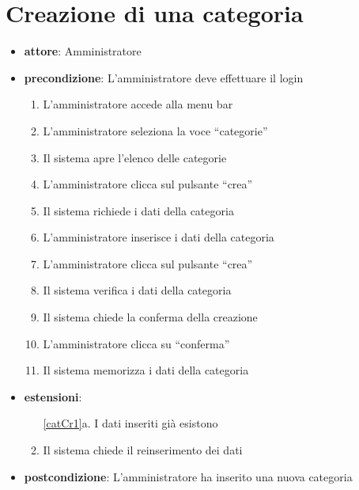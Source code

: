 \section{Creazione di una categoria}
\begin{itemize}
	\item \textbf{attore}: Amministratore
	\item \textbf{precondizione}: L’amministratore deve effettuare il login
	
	\begin{enumerate}
		\item L’amministratore accede alla menu bar
		\item L’amministratore seleziona la voce “categorie”
		\item Il sistema apre l’elenco delle categorie
		\item L’amministratore clicca sul pulsante “crea”
		\item Il sistema richiede i dati della categoria
		\item L’amministratore inserisce i dati della categoria
		\item L’amministratore clicca sul pulsante “crea”
		\label{catCr1}
		\item Il sistema verifica i dati della categoria
		\item Il sistema chiede la conferma della creazione
		\item L’amministratore clicca su “conferma”
		\item Il sistema memorizza i dati della categoria
	\end{enumerate}

	\item \textbf{estensioni}:
	\begin{enumerate}
		\item[\ref{catCr1}a.] I dati inseriti già esistono 
		\item Il sistema chiede il reinserimento dei dati
	\end{enumerate}

	\item \textbf{postcondizione}: L’amministratore ha inserito una nuova categoria
\end{itemize}


